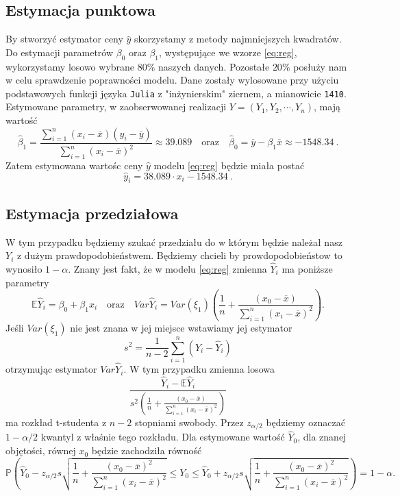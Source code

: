 \documentclass[12pt,leqno]{article}
\theoremstyle{exer}
\begin{document}
	\subsection{Estymacja punktowa}
	By stworzyć estymator ceny $\hat y$ skorzystamy z metody najmniejszych kwadratów. Do estymacji parametrów $\beta_0$ oraz $\beta_1$, występujące we wzorze \eqref{eq:reg}, wykorzystamy losowo wybrane $80\%$ naszych danych. Pozostałe $20\%$ posłuży nam w celu sprawdzenie poprawności modelu. Dane zostały wylosowane przy użyciu podstawowych funkcji języka \verb|Julia| z "inżynierskim" ziernem, a mianowicie \verb|1410|. Estymowane parametry, w zaobserwowanej realizacji $Y=(Y_1, Y_2,\cdots,Y_n)$, mają wartość
	\begin{equation}
		\hat\beta_1=\frac{\sum_{i=1}^n\left(x_i-\overline{x}\right)\left(y_i-\overline{y}\right)}
		{\sum_{i=1}^n\left(x_i-\overline{x}\right)^2}\approx39.089 \quad \text{oraz} \quad
		\hat\beta_0=\overline{y}-\beta_1\overline{x}\approx-1548.34\ .
	\end{equation}
	Zatem estymowana wartośc ceny $\hat y$ modelu \eqref{eq:reg} będzie miała postać
	\begin{equation}
		\hat y_i = 38.089\cdot x_i -1548.34\ .
	\end{equation}
	\subsection{Estymacja przedziałowa}
	W tym przypadku będziemy szukać przedziału do w którym będzie należał nasz $Y_i$ z dużym prawdopodobieństwem. Będziemy chcieli by prowdopodobieństow to wynosiło $1-\alpha$. Znany jest fakt, że w modelu \eqref{eq:reg} zmienna $\hat{Y}_i$ ma poniższe parametry
	\begin{equation}
		\mathbb{E}\hat Y_i = \beta_0+\beta_1x_i \quad\text{oraz}\quad Var \hat Y_i=Var\left(\xi_1\right)\left(\frac{1}{n}+\frac{(x_0-\overline{x})}{\sum_{i=1}^{n}\left(x_i-\overline{x}\right)^2}\right).
	\end{equation} 
	Jeśli $Var\left(\xi_1\right)$ nie jest znana w jej miejsce wstawiamy jej estymator
	\begin{equation}
		s^2=\frac{1}{n-2}\sum_{i=1}^{n}\left(Y_i-\hat Y_i\right)
	\end{equation}
	otrzymując estymator $Var \hat Y_i$. W tym przypadku zmienna losowa
	\begin{equation}
		\frac{\hat Y_i-\mathbb{E}\hat Y_i}{s^2\left(\frac{1}{n}+\frac{(x_0-\overline{x})}{\sum_{i=1}^{n}\left(x_i-\overline{x}\right)^2}\right)}
	\end{equation}
	ma rozkład t-studenta z $n-2$ stopniami swobody. Przez $z_{\alpha/2}$ będziemy oznaczać $1-\alpha/2$ kwantyl z właśnie tego rozkładu. Dla estymowane wartość $\hat Y_0$, dla znanej objętości, równej $x_0$ będzie zachodziła równość
	\begin{equation}
		\mathbb{P}\left(\hat Y_0 - z_{\alpha/2}s\sqrt{\frac{1}{n}+\frac{\left(x_0-\overline{x}\right)^2}{\sum_{i=1}^n\left(x_i-\overline{x}\right)^2}}\leq Y_0\leq\hat Y_0 + z_{\alpha/2}s\sqrt{\frac{1}{n}+\frac{\left(x_0-\overline{x}\right)^2}{\sum_{i=1}^n\left(x_i-\overline{x}\right)^2}}\right)=1-\alpha.
	\end{equation}
\end{document}
